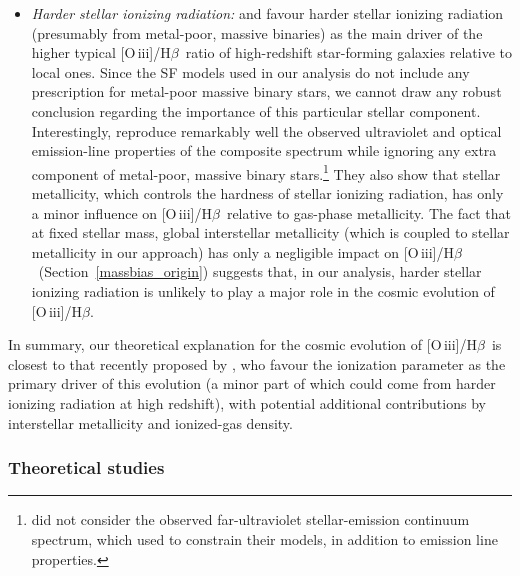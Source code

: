 \documentclass[fleqn,usenatbib]{mnras}
\newcommand{\oiiihb}{\hbox{[O\,{\sc iii}]/H$\beta$}}
\begin{document}
\begin{itemize}
\item{\it Harder stellar ionizing radiation:}
\citet{Steidel14,Steidel16} and \citet{Strom17} favour harder 
stellar ionizing radiation (presumably from metal-poor, massive
binaries)  as the main driver of the higher typical \oiiihb\ ratio of
high-redshift star-forming galaxies relative to local ones. Since the
\citet{Gutkin16} SF models used in our analysis do not include any
prescription for metal-poor massive binary stars, we cannot draw any
robust conclusion regarding the importance of this particular stellar
component. Interestingly, \citet{Gutkin16} reproduce remarkably 
well the observed ultraviolet and optical emission-line properties of
the composite  \citet{Steidel16} spectrum  while ignoring any
extra component of metal-poor,  massive binary
stars.\footnote{\citet{Gutkin16} did not consider the observed
  far-ultraviolet stellar-emission continuum spectrum, which
  \citet{Steidel16} used to constrain their models, in addition to
  emission line properties.} They 
also show that stellar metallicity, which controls the  hardness of
stellar ionizing radiation, has only a minor influence on \oiiihb\
relative to gas-phase metallicity. The fact that at fixed stellar
mass, global interstellar metallicity (which is coupled to stellar
metallicity in our approach) has only a negligible impact on \oiiihb\ 
(Section~\ref{massbias_origin}) suggests that, in our analysis, harder 
stellar ionizing radiation is unlikely to play a major role in the
cosmic evolution  of \oiiihb. 

\end{itemize}

In summary, our theoretical explanation for the cosmic evolution of
\oiiihb\ is closest to that recently proposed by \citet{Kashino17},
who favour the ionization  parameter as the primary driver of this
evolution (a minor part of which could  come from harder ionizing
radiation at high redshift), with potential additional  contributions
by interstellar metallicity and ionized-gas density. 

\subsubsection{Theoretical studies}
\end{document}
